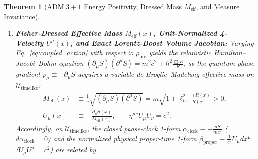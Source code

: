 \documentclass[11pt, a4paper]{article}
\newtheorem{theorem}{Theorem}[section]
\theoremstyle{definition}
\begin{document}
\begin{theorem}[ADM $3+1$ Energy Positivity, Dressed Mass $M_{\text{eff}}$, and Measure Invariance]
\begin{enumerate}[label=(\roman*)]
\begin{equation}
\begin{aligned}
    &\qquad = \frac{\hbar^2}{4}\int_{K} d^3x \, \rho_{\text{inv}}(x)\Big[ (\partial_n \ln\rho_{\text{inv}})^2 - |\nabla \ln\rho_{\text{inv}}|^2 \Big] < 0.
    \end{aligned}
    \end{equation}
    The bound is a genuine hypothesis and is not fixed by the packet width alone. For the unboosted positive-frequency Gaussian packet with $\rho_{\text{inv}}(0,\mathbf{x}) = \exp(-|\mathbf{x}|^2/2\sigma_0^2)$, at every width $\sigma_0 > 0$ the set $\Sigma_{\mathcal{O}}(0) \cap \mathcal{U}_{\text{timelike}}$ is an open ball $|\mathbf{x}| < r_*(\sigma_0)$ of finite radius, and for every compact $K$ of positive volume inside this ball there is $T(K) > 0$ such that for all $|t| \le T(K)$ one has $K \subset \mathcal{U}_{\text{timelike}}$, $\sup_K |\mathbf{v}_{\text{eff}}| \le c/2$, and Eq.~\eqref{eq:dilatation_coercivity_bound} holds on $K$ with $v_{\max} = c/2$. The duration $T(K)$ cannot be chosen uniformly as $K$ shrinks to the centre.
    \item \textbf{Fisher-Dressed Effective Mass $M_{\text{eff}}(x)$, Unit-Normalized 4-Velocity $U^\mu(x)$, and Exact Lorentz-Boost Volume Jacobian:} Varying Eq.~\eqref{eq:coupled_action} with respect to $\rho_{\text{inv}}$ yields the relativistic Hamilton--Jacobi--Bohm equation $(\partial_\mu S)(\partial^\mu S) = m^2 c^2 + \hbar^2 \frac{\Box R}{R}$, so the quantum phase gradient $p_\mu \equiv -\partial_\mu S$ acquires a variable de Broglie--Madelung effective mass \cite{deBroglie1924, Takabayasi1952} on $\mathcal{U}_{\text{timelike}}$:
    \begin{equation}
    \label{eq:dressed_mass_velocity}
    \begin{aligned}
    M_{\text{eff}}(x) &\equiv \frac{1}{c}\sqrt{(\partial_\mu S)(\partial^\mu S)} = m\sqrt{1 + \ell_C^2 \frac{\Box R(x)}{R(x)}} > 0, \\
    U_\mu(x) &\equiv -\frac{\partial_\mu S(x)}{M_{\text{eff}}(x)}, \qquad \eta^{\mu\nu}U_\mu U_\nu = c^2.
    \end{aligned}
    \end{equation}
    Accordingly, on $\mathcal{U}_{\text{timelike}}$, the closed phase-clock 1-form $\alpha_{\text{clock}} \equiv -\frac{dS}{mc^2}$ ($d\alpha_{\text{clock}} = 0$) and the normalized physical proper-time 1-form $\beta_{\text{proper}} \equiv \frac{1}{c^2}U_\mu dx^\mu$ ($U_\mu U^\mu = c^2$) are related by
    \begin{equation}
    \label{eq:clock_vs_proper_oneform}
    \begin{aligned}

\end{aligned}
\end{equation}
\end{enumerate}
\end{theorem}
\end{document}
